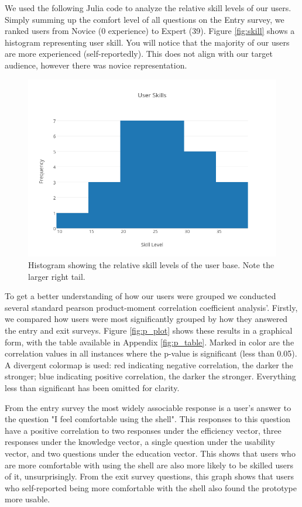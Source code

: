 We used the following Julia code to analyze the relative skill levels of our
users. Simply summing up the comfort level of all questions on the Entry survey,
we ranked users from Novice (0 experience) to Expert (39). Figure
\ref{fig:skill} shows a histogram representing user skill. You will notice that
the majority of our users are more experienced (self-reportedly). This does not
align with our target audience, however there was novice representation.
\begin{figure}[ht]
  \centering
  \includegraphics[width=0.8\linewidth]{figures/stats/user-skills.png}
  \caption{\label{fig:Skill} Histogram showing the relative skill levels of the
    user base. Note the larger right tail. }
\end{figure}

To get a better understanding of how our users were grouped we conducted several
standard pearson product-moment correlation coefficient analysis'. Firstly, we
compared how users were most significantly grouped by how they answered the
entry and exit surveys. Figure \ref{fig:p_plot} shows these results in a
graphical form, with the table available in Appendix \ref{fig:p_table}. Marked
in color are the correlation values in all instances where the p-value is
significant (less than 0.05). A divergent colormap is used: red indicating
negative correlation, the darker the stronger; blue indicating positive
correlation, the darker the stronger. Everything less than significant has been
omitted for clarity.

From the entry survey the most widely associable response is a user's answer to
the question "I feel comfortable using the shell". This responses to this
question have a positive correlation to two responses under the efficiency
vector, three responses under the knowledge vector, a single question under the
usability vector, and two questions under the education vector. This shows that
users who are more comfortable with using the shell are also more likely to be
skilled users of it, unsurprisingly. From the exit survey questions, this graph
shows that users who self-reported being more comfortable with the shell also
found the prototype more usable.

